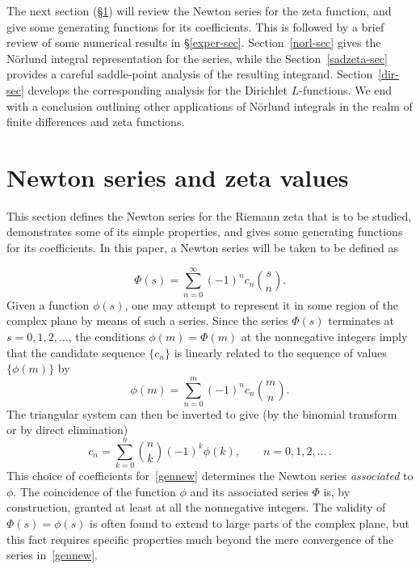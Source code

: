 \documentclass{amsart}
\begin{document}
The next section (\S\ref{newtser-sec}) will review the Newton series for the zeta function,
and give some generating functions for its coefficients. This is followed
by a brief review of some numerical results in \S\ref{exper-sec}. Section~\ref{norl-sec}
gives the N\"orlund integral representation for the series,
while the Section~\ref{sadzeta-sec} provides a careful saddle-point analysis 
of the resulting integrand.  Section~\ref{dir-sec} develops the corresponding analysis
for the Dirichlet $L$-functions.
 We end with a conclusion outlining other applications of N\"orlund integrals
in the realm of finite differences and zeta functions.




\section{Newton series and zeta values}\label{newtser-sec}


This section defines the Newton series for the Riemann zeta
that is to be studied, demonstrates some of its simple properties,
and gives some generating functions for its coefficients.
In this paper, a Newton series will be taken to be defined as

\begin{equation}\label{gennew}
\Phi(s)=\sum_{n=0}^\infty (-1)^n c_n \binom{s}{n}.
\end{equation}
Given a function $\phi(s)$, one may attempt to represent it 
in some region of the complex plane by means of 
such a series. Since the series $\Phi(s)$ terminates at $s=0,1,2,\ldots$,
the conditions $\phi(m)=\Phi(m)$ at the nonnegative integers
imply that the candidate sequence $\{c_n\}$ is linearly related to the
sequence of values $\{\phi(m)\}$ by
\[
\phi(m)=\sum_{n=0}^m (-1)^n c_n \binom{m}{n}.
\]
The triangular system can then be inverted to 
give (by the binomial transform~\cite{GrKnPa89} or by direct elimination)
\begin{equation}\label{gencoeff}
c_n = \sum_{k=0}^{n} \binom{n}{k} (-1)^k \phi(k), \qquad n=0,1,2,\ldots\,.
\end{equation}
This choice of coefficients for~\eqref{gennew}
determines the Newton series \emph{associated} to $\phi$.
The coincidence of 
the function $\phi$ and its associated series
$\Phi$ is, by construction, granted at least
at all the nonnegative integers. 
The validity
of $\Phi(s)=\phi(s)$  is often found to extend to large
parts of the complex plane, but this fact requires specific
properties much beyond the mere convergence of the series in~\eqref{gennew}.
\end{document}
